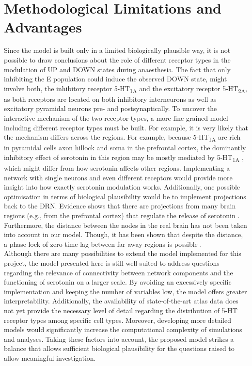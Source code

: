 \section{Methodological Limitations and Advantages}
\noindent
\indent 
Since the model is built only in a limited biologically plausible way, it is not possible to draw conclusions about the role of different receptor types in the modulation of UP and DOWN states during anaesthesia. The fact that only inhibiting the E population could induce the observed DOWN state, might involve both, the inhibitory receptor 5-HT\textsubscript{1A} and the excitatory receptor 5-HT\textsubscript{2A}, as both receptors are located on both inhibitory interneurons as well as excitatory pyramidal neurons pre- and postsynaptically\cite{celadaSerotoninModulationCortical2013}. To uncover the interactive mechanism of the two receptor types, a more fine grained model including different receptor types must be built. For example, it is very likely that the mechanism differs across the regions. For example, because 5-HT\textsubscript{1A} are rich in pyramidal cells axon hillock and soma in the prefrontal cortex, the dominantly inhibitory effect of serotonin in this region may be mostly mediated by 5-HT\textsubscript{1A} \cite{puigSerotoninModulationPrefrontoHippocampal2015}, which might differ from how serotonin affects other regions. Implementing a network with single neurons and even different receptors would provide more insight into how exactly serotonin modulation works.
Additionally, one possible optimisation in terms of biological plausibility would be to implement projections back to the DRN. Evidence shows that there are projections from many brain regions (e.g., from the prefrontal cortex) that regulate the release of serotonin \cite{celadaSerotoninModulationCortical2013}. 
Furthermore, the distance between the nodes in the real brain has not been taken into account in our model. Though, it has been shown that despite the distance, a phase lock of zero time lag between far away regions is possible \cite{vicenteDynamicalRelayingCan2008}. 
\\
\indent Although there are many possibilities to extend the model implemented for this project, the model presented here is still well suited to address questions regarding the relevance of connectivity between network components and the functioning of serotonin on a larger scale. By avoiding an excessively specific implementation and keeping the number of variables low, the model offers greater interpretability. Additionally, the availability of state-of-the-art atlas data does not yet provide the necessary level of detail regarding the distribution of 5-HT receptor types among specific cell types. Moreover, developing more detailed models would significantly increase the computational complexity of simulations and analyses. Taking these factors into account, the proposed model strikes a balance that allows sufficient biological plausibility for the questions raised to allow meaningful investigation.



